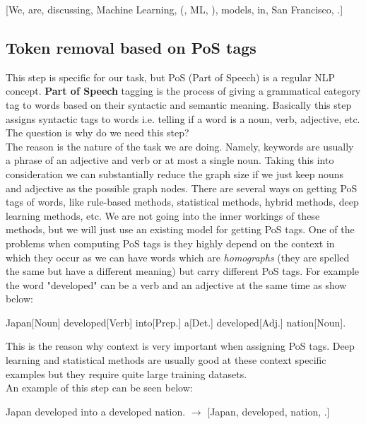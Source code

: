 \documentclass[12pt]{article}
\numberwithin{equation}{section}
\begin{document}
\begin{spacing}{1.5}
\begin{center}
		[We, are, discussing, Machine Learning, (, ML, ), models, in, San Francisco, .]
	\end{center} 
	
	\subsection{Token removal based on PoS tags}
	This step is specific for our task, but PoS (Part of Speech) is a regular NLP concept. \textbf{Part of Speech} tagging is the process of giving a grammatical category tag to words based on their syntactic and semantic meaning. Basically this step assigns syntactic tags to words i.e. telling if a word is a noun, verb, adjective, etc. The question is why do we need this step?\\
	The reason is the nature of the task we are doing. Namely, keywords are usually a phrase of an adjective and verb or at most a single noun. Taking this into consideration we can substantially reduce the graph size if we just keep nouns and adjective as the possible graph nodes. There are several ways on getting PoS tags of words, like rule-based methods, statistical methods, hybrid methods, deep learning methods, etc. 
	We are not going into the inner workings of these methods, but we will just use an existing model for getting PoS tags. One of the problems when computing PoS tags is they highly depend on the context in which they occur as we can have words which are \textit{homographs} (they are spelled the same but have a different meaning) but carry different PoS tags. For example the word "developed" can be a verb and an adjective at the same time as show below:
	\begin{center}
		Japan[Noun] developed[Verb] into[Prep.] a[Det.] developed[Adj.] nation[Noun].
	\end{center}
	This is the reason why context is very important when assigning PoS tags. Deep learning and statistical methods are usually good at these context specific examples but they require quite large training datasets. \\
	An example of this step can be seen below:
	\begin{center}
		Japan developed into a developed nation. $\rightarrow$ [Japan, developed, nation, .]
	\end{center}	  
	

\end{spacing}
\end{document}
